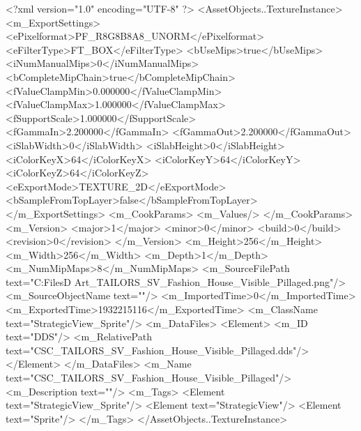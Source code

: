 <?xml version="1.0" encoding="UTF-8" ?>
<AssetObjects..TextureInstance>
	<m_ExportSettings>
		<ePixelformat>PF_R8G8B8A8_UNORM</ePixelformat>
		<eFilterType>FT_BOX</eFilterType>
		<bUseMips>true</bUseMips>
		<iNumManualMips>0</iNumManualMips>
		<bCompleteMipChain>true</bCompleteMipChain>
		<fValueClampMin>0.000000</fValueClampMin>
		<fValueClampMax>1.000000</fValueClampMax>
		<fSupportScale>1.000000</fSupportScale>
		<fGammaIn>2.200000</fGammaIn>
		<fGammaOut>2.200000</fGammaOut>
		<iSlabWidth>0</iSlabWidth>
		<iSlabHeight>0</iSlabHeight>
		<iColorKeyX>64</iColorKeyX>
		<iColorKeyY>64</iColorKeyY>
		<iColorKeyZ>64</iColorKeyZ>
		<eExportMode>TEXTURE_2D</eExportMode>
		<bSampleFromTopLayer>false</bSampleFromTopLayer>
	</m_ExportSettings>
	<m_CookParams>
		<m_Values/>
	</m_CookParams>
	<m_Version>
		<major>1</major>
		<minor>0</minor>
		<build>0</build>
		<revision>0</revision>
	</m_Version>
	<m_Height>256</m_Height>
	<m_Width>256</m_Width>
	<m_Depth>1</m_Depth>
	<m_NumMipMaps>8</m_NumMipMaps>
	<m_SourceFilePath text="C:\Users\Shadow\Desktop\Working Files\2D Art\Quarters\Tailors\StrategicView\CSC_TAILORS_SV_Fashion_House_Visible_Pillaged.png"/>
	<m_SourceObjectName text=""/>
	<m_ImportedTime>0</m_ImportedTime>
	<m_ExportedTime>1932215116</m_ExportedTime>
	<m_ClassName text="StrategicView_Sprite"/>
	<m_DataFiles>
		<Element>
			<m_ID text="DDS"/>
			<m_RelativePath text="CSC_TAILORS_SV_Fashion_House_Visible_Pillaged.dds"/>
		</Element>
	</m_DataFiles>
	<m_Name text="CSC_TAILORS_SV_Fashion_House_Visible_Pillaged"/>
	<m_Description text=""/>
	<m_Tags>
		<Element text="StrategicView_Sprite"/>
		<Element text="StrategicView"/>
		<Element text="Sprite"/>
	</m_Tags>
</AssetObjects..TextureInstance>

